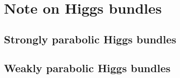 \section{Note on Higgs bundles}

\subsection{Strongly parabolic Higgs bundles}

\subsection{Weakly parabolic Higgs bundles}

